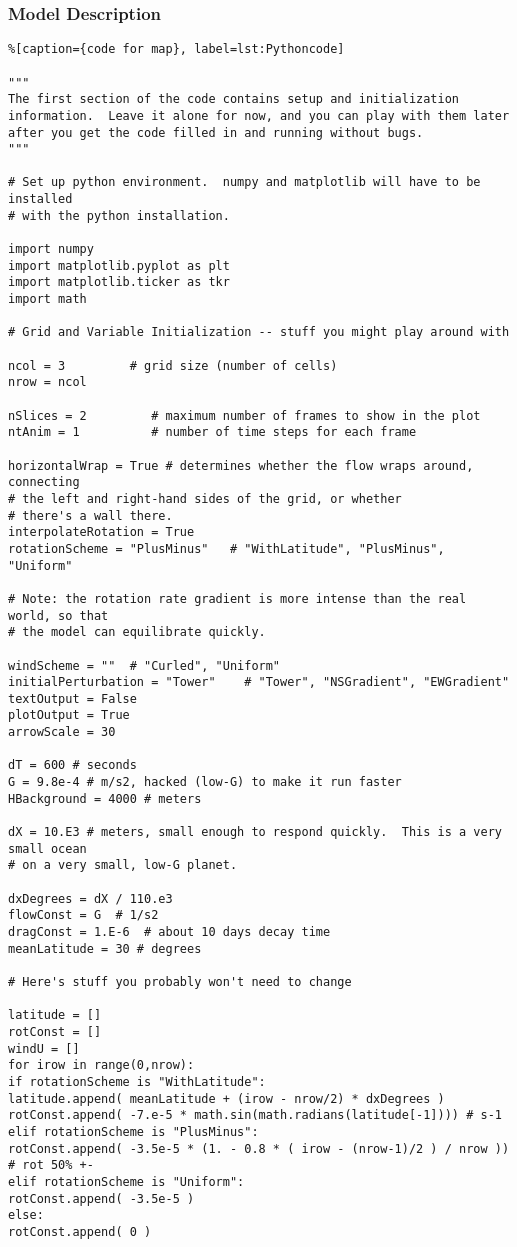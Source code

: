 {\subsubsection{Model Description}

\begin{lstlisting}%[caption={code for map}, label=lst:Pythoncode]

"""
The first section of the code contains setup and initialization 
information.  Leave it alone for now, and you can play with them later 
after you get the code filled in and running without bugs.  
"""

# Set up python environment.  numpy and matplotlib will have to be installed
# with the python installation.

import numpy
import matplotlib.pyplot as plt
import matplotlib.ticker as tkr
import math

# Grid and Variable Initialization -- stuff you might play around with

ncol = 3         # grid size (number of cells)
nrow = ncol

nSlices = 2         # maximum number of frames to show in the plot
ntAnim = 1          # number of time steps for each frame

horizontalWrap = True # determines whether the flow wraps around, connecting
# the left and right-hand sides of the grid, or whether
# there's a wall there. 
interpolateRotation = True
rotationScheme = "PlusMinus"   # "WithLatitude", "PlusMinus", "Uniform"

# Note: the rotation rate gradient is more intense than the real world, so that
# the model can equilibrate quickly.

windScheme = ""  # "Curled", "Uniform"
initialPerturbation = "Tower"    # "Tower", "NSGradient", "EWGradient"
textOutput = False
plotOutput = True
arrowScale = 30

dT = 600 # seconds
G = 9.8e-4 # m/s2, hacked (low-G) to make it run faster
HBackground = 4000 # meters

dX = 10.E3 # meters, small enough to respond quickly.  This is a very small ocean
# on a very small, low-G planet.  

dxDegrees = dX / 110.e3
flowConst = G  # 1/s2
dragConst = 1.E-6  # about 10 days decay time
meanLatitude = 30 # degrees

# Here's stuff you probably won't need to change

latitude = []
rotConst = []
windU = []
for irow in range(0,nrow):
if rotationScheme is "WithLatitude":
latitude.append( meanLatitude + (irow - nrow/2) * dxDegrees )
rotConst.append( -7.e-5 * math.sin(math.radians(latitude[-1]))) # s-1
elif rotationScheme is "PlusMinus":
rotConst.append( -3.5e-5 * (1. - 0.8 * ( irow - (nrow-1)/2 ) / nrow )) # rot 50% +-
elif rotationScheme is "Uniform":
rotConst.append( -3.5e-5 ) 
else:
rotConst.append( 0 )


\end{lstlisting}}
